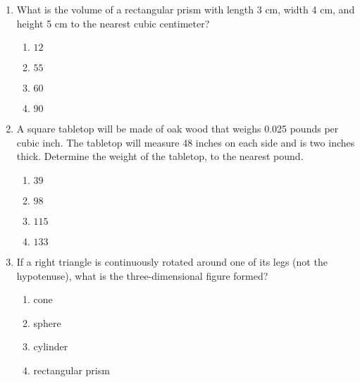 \begin{enumerate}
\item What is the volume of a rectangular prism with length 3 cm, width 4 cm, and height 5 cm to the nearest cubic centimeter? 
\begin{multicols}{2}
  \begin{enumerate}
    \item $12$
    \item $55$
    \item $60$
    \item $90$
  \end{enumerate}
  \end{multicols} \vspace{0.5cm}

\item A square tabletop will be made of oak wood that weighs 0.025 pounds per cubic inch. The tabletop will measure 48 inches on each side and is two inches thick. Determine the weight of the tabletop, to the nearest pound.
\begin{multicols}{2}
  \begin{enumerate}
  \item $39$
  \item $98$
  \item $115$
  \item $133$
\end{enumerate}
\end{multicols} \vspace{3cm}

\item If a right triangle is continuously rotated around one of its legs (not the hypotenuse), what is the three-dimensional figure formed?
  \begin{multicols}{2}
  \begin{enumerate}
    \item cone
    \item sphere
    \item cylinder
    \item rectangular prism
  \end{enumerate}
\end{multicols}


\end{enumerate}
